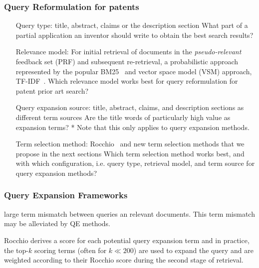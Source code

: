 \documentclass[xcolor=dvipsnames]{beamer}
\begin{document}
\begin{frame}
\frametitle{Query Reformulation for patents}

\begin{small}
\begin{itemize}
\item [Query type:] title, abstract, claims or the description section
What part of a partial application an inventor
should write to obtain the best search results?

\item [Relevance model:]  For initial retrieval of documents in the \emph{pseudo-relevant} feedback set (PRF) and subsequent re-retrieval, a probabilistic approach represented by the popular BM25~\cite{Robertson1993} and vector space model (VSM) approach, TF-IDF~\cite{Salton1975}. 
Which relevance model works best for query reformulation
for patent prior art search? 

\item [Query expansion source:]  title, abstract,
claims, and description sections as different term sources
Are the title words of particularly high value as expansion terms? 
* Note that this only applies to query expansion methods. 

\item [ Term selection method:] Rocchio~\cite{Salton1971} and new term selection
methods that we propose in the next sections
Which term selection method works best, and with which configuration, i.e. query type, retrieval model, and term source for query expansion methods? 
\end{itemize}
\end{small}

\end{frame}


\begin{frame}
\frametitle{Query Expansion Frameworks}

large term mismatch between queries an
relevant documents. This term mismatch may be alleviated by QE methods.

Rocchio derives a score for each potential query expansion term and in practice, the top-$k$ scoring terms (often for $k\ll200$) are used to expand the query and are
weighted according to their Rocchio score during the second stage
of retrieval. 
\end{frame}
\end{document}
